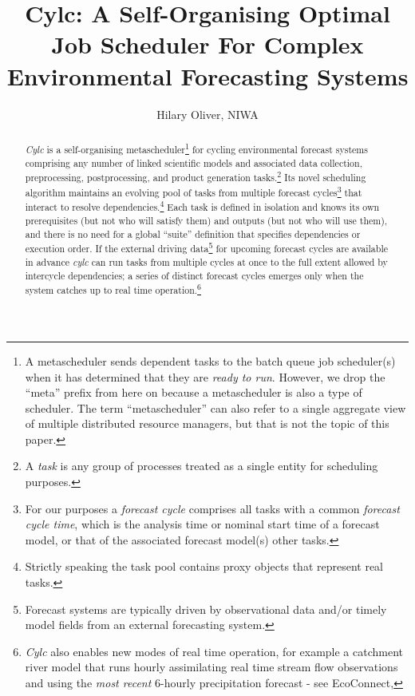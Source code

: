 \documentclass[11pt,a4paper]{article}
\title{Cylc: A Self-Organising Optimal Job Scheduler 
For Complex Environmental Forecasting Systems}
\author{Hilary Oliver, NIWA}
\begin{document}
\maketitle

\pagebreak
\tableofcontents
\pagebreak

\begin{abstract}

    {\em Cylc} is a self-organising metascheduler\footnote{A
    metascheduler sends dependent tasks to the batch queue job
    scheduler(s) when it has determined that they are {\em ready to
    run}. However, we drop the ``meta'' prefix from here on because a
    metascheduler is also a type of scheduler. The term
    ``metascheduler'' can also refer to a single aggregate view of
    multiple distributed resource managers, but that is not the topic of
    this paper.} for cycling environmental forecast systems comprising
    any number of linked scientific models and associated data
    collection, preprocessing, postprocessing, and product generation
    tasks.\footnote{A {\em task} is any group of processes treated as a
    single entity for scheduling purposes.} Its novel scheduling
    algorithm maintains an evolving pool of tasks from multiple forecast
    cycles\footnote{For our purposes a {\em forecast cycle} comprises
    all tasks with a common {\em forecast cycle time}, which is the
    analysis time or nominal start time of a forecast model, or that of
    the associated forecast model(s) other tasks.} that interact to
    resolve dependencies.\footnote{Strictly speaking the task pool
    contains proxy objects that represent real tasks.} Each task is
    defined in isolation and knows its own prerequisites (but not who
    will satisfy them) and outputs (but not who will use them), and
    there is no need for a global ``suite'' definition that specifies
    dependencies or execution order.  If the external driving
    data\footnote{Forecast systems are typically driven by observational
    data and/or timely model fields from an external forecasting
    system.} for upcoming forecast cycles are available in advance {\em
    cylc} can run tasks from multiple cycles at once to the full extent
    allowed by intercycle dependencies; a series of distinct forecast
    cycles emerges only when the system catches up to real time
    operation.\footnote{{\em Cylc} also enables new modes of real time
    operation, for example a catchment river model that runs hourly
    assimilating real time stream flow observations and using the {\em
    most recent} 6-hourly precipitation forecast - see EcoConnect,
}
\end{abstract}
\end{document}
